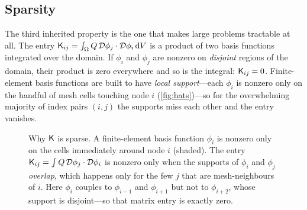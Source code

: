 \subsection{Sparsity}
\label{sec:sparsity}

The third inherited property is the one that makes large problems tractable at
all. The entry $\mathsf{K}_{ij}=\int_\Omega Q\,\mathcal{D}\phi_j\cdot\mathcal{D}\phi_i\,\mathrm{d}V$ is a
product of two basis functions integrated over the domain. If $\phi_i$ and
$\phi_j$ are nonzero on \emph{disjoint} regions of the domain, their product is
zero everywhere and so is the integral: $\mathsf{K}_{ij}=0$. Finite-element basis
functions are built to have \emph{local support}---each $\phi_i$ is nonzero only
on the handful of mesh cells touching node $i$ (\cref{fig:hats})---so for the
overwhelming majority of index pairs $(i,j)$ the supports miss each other and the
entry vanishes.

\begin{figure}[t]
\centering
{}
\caption[Local support gives sparsity]{Why $\mathsf{K}$ is sparse. A finite-element
basis function $\phi_i$ is nonzero only on the cells immediately around node $i$
(shaded). The entry $\mathsf{K}_{ij}=\int Q\,\mathcal{D}\phi_j\cdot\mathcal{D}\phi_i$ is
nonzero only when the supports of $\phi_i$ and $\phi_j$ \emph{overlap}, which
happens only for the few $j$ that are mesh-neighbours of $i$. Here $\phi_i$
couples to $\phi_{i-1}$ and $\phi_{i+1}$ but not to $\phi_{i+2}$, whose support is
disjoint---so that matrix entry is exactly zero.}
\label{fig:sparsity-support}
\end{figure}

